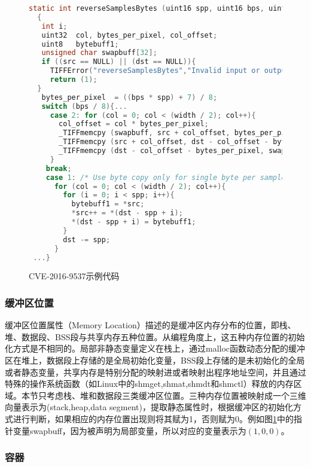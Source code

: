 {\begin{figure}[h]
\begin{lstlisting}[language=C]
static int reverseSamplesBytes (uint16 spp, uint16 bps, uint32 width, uint8 *src, uint8 *dst)
  {
   int i;
   uint32  col, bytes_per_pixel, col_offset;
   uint8   bytebuff1;
   unsigned char swapbuff[32];
   if ((src == NULL) || (dst == NULL)){
     TIFFError("reverseSamplesBytes","Invalid input or output buffer");
     return (1);
  }
   bytes_per_pixel  = ((bps * spp) + 7) / 8;
   switch (bps / 8){...
     case 2: for (col = 0; col < (width / 2); col++){
       col_offset = col * bytes_per_pixel;                     
       _TIFFmemcpy (swapbuff, src + col_offset, bytes_per_pixel);
       _TIFFmemcpy (src + col_offset, dst - col_offset - bytes_per_pixel, bytes_per_pixel);
       _TIFFmemcpy (dst - col_offset - bytes_per_pixel, swapbuff, bytes_per_pixel);
     }
    break;
    case 1: /* Use byte copy only for single byte per sample data */
      for (col = 0; col < (width / 2); col++){ 
        for (i = 0; i < spp; i++){
          bytebuff1 = *src;
          *src++ = *(dst - spp + i);
          *(dst - spp + i) = bytebuff1;
        }
        dst -= spp;
      }
 ...}
\end{lstlisting}

\caption{CVE-2016-9537示例代码}
\label{CVE-2016-9537示例代码}
\end{figure}

\subsubsection{缓冲区位置}

缓冲区位置属性（Memory Location）描述的是缓冲区内存分布的位置，即栈、堆、数据段、BSS段与共享内存五种位置。从编程角度上，这五种内存位置的初始化方式是不相同的。局部非静态变量定义在栈上，通过malloc函数动态分配的缓冲区在堆上，数据段上存储的是全局初始化变量，BSS段上存储的是未初始化的全局或者静态变量，共享内存是特别分配的映射进或者映射出程序地址空间，并且通过特殊的操作系统函数（如Linux中的shmget,shmat,shmdt和shmctl）释放的内存区域。本节只考虑栈、堆和数据段三类缓冲区位置。三种内存位置被映射成一个三维向量表示为{(stack,heap,data segment)}，提取静态属性时，根据缓冲区的初始化方式进行判断，如果相应的内存位置出现则将其赋为1，否则赋为0。例如图\ref{CVE-2016-9537示例代码}中的指针变量swapbuff，因为被声明为局部变量，所以对应的变量表示为$(1,0,0)$。

\subsubsection{容器}

}
